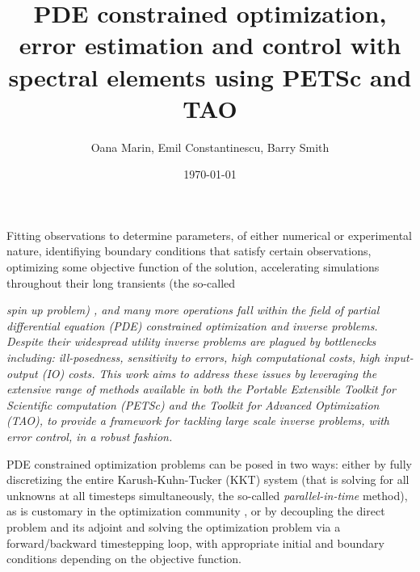 \documentclass[10pt]{article}
\begin{document}

\title{PDE constrained optimization, error estimation and control with spectral elements using PETSc and TAO}
\vspace{1cm}
\author{Oana Marin, Emil Constantinescu, Barry Smith}
\date{\today}
\maketitle

Fitting observations to determine parameters, of either numerical or
experimental nature, identifiying boundary conditions that satisfy certain
observations, optimizing some objective function of the solution, accelerating simulations throughout their long
transients (the so-called {\em spin up problem) \cite{}, and many more operations fall within the field of
partial differential equation (PDE) constrained optimization and inverse problems.
Despite their
widespread utility inverse problems are plagued by
bottlenecks including: ill-posedness, sensitivity to errors, high
computational costs, high input-output (IO) costs. This work aims
to address these issues by leveraging the extensive range of methods
available in both the Portable Extensible Toolkit for Scientific computation (PETSc) and the Toolkit for Advanced Optimization (TAO), to provide a framework for tackling
large scale inverse problems, with error control, in a robust fashion.


PDE constrained optimization problems can be posed in two
ways: either by fully discretizing
the entire Karush-Kuhn-Tucker (KKT) system (that is solving for all unknowns at all timesteps simultaneously, the so-called {\em parallel-in-time} method), as is customary in the
optimization community \cite{Haber_2007}, or by decoupling the direct
problem and its adjoint and solving the optimization problem via a
forward/backward timestepping loop, with appropriate initial and
boundary conditions depending on the objective function.

}
\end{document}
